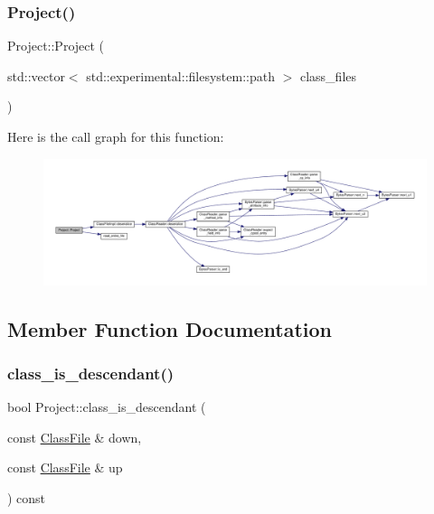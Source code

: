 \subsubsection{\texorpdfstring{Project()}{Project()}}
{\footnotesize\ttfamily Project\+::\+Project (\begin{DoxyParamCaption}\item[{std\+::vector$<$ std\+::experimental\+::filesystem\+::path $>$}]{class\+\_\+files }\end{DoxyParamCaption})}

Here is the call graph for this function\+:
\nopagebreak
\begin{figure}[H]
\begin{center}
\leavevmode
\includegraphics[width=350pt]{classProject_aa263ab552c113e7a9db9e90c3dac0879_cgraph}
\end{center}
\end{figure}


\subsection{Member Function Documentation}
\mbox{\label{classProject_a6ef93527bbe86e9bdfbc6d624eab0834}} 
\subsubsection{\texorpdfstring{class\+\_\+is\+\_\+descendant()}{class\_is\_descendant()}}
{\footnotesize\ttfamily bool Project\+::class\+\_\+is\+\_\+descendant (\begin{DoxyParamCaption}\item[{const \hyperlink{classfile_8h_a00b46b60bc40e813e9fb1bb049174346}{Class\+File} \&}]{down,  }\item[{const \hyperlink{classfile_8h_a00b46b60bc40e813e9fb1bb049174346}{Class\+File} \&}]{up }\end{DoxyParamCaption}) const\hspace{0.3cm}{\ttfamily [private]}}

